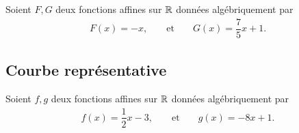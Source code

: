 \begin{frame}{3}
	Soient $F, G$ deux fonctions affines sur $\mathbb{R}$ données algébriquement par
		\begin{align*}
			F(x) = -x, && \text{ et } && G(x) =  \dfrac75 x +1.
		\end{align*}
	
\end{frame}

\subsection{Courbe représentative}


\begin{frame}{4}	

	Soient $f, g$ deux fonctions affines sur $\mathbb{R}$ données algébriquement par
		\begin{align*}
			f(x) = \dfrac12 x - 3, && \text{ et } && g(x) = -8 x + 1.
		\end{align*}
		
\end{frame}



